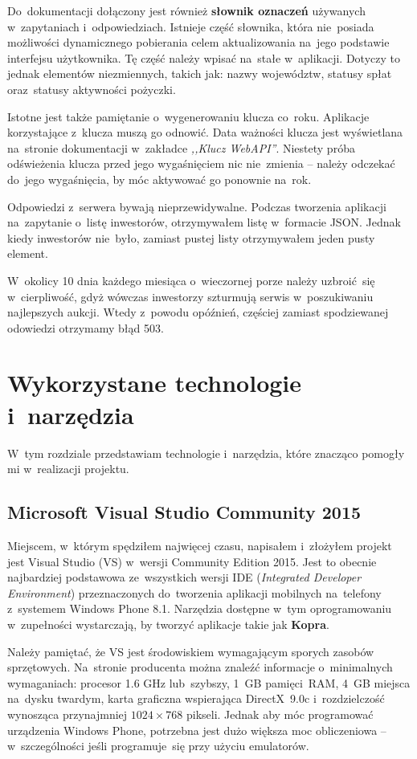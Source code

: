 \documentclass[a4paper,twoside,titlepage,openright]{book}
\begin{document}
Do~dokumentacji dołączony jest również \textbf{słownik oznaczeń} używanych w~zapytaniach i~odpowiedziach. Istnieje część słownika, która nie~posiada możliwości dynamicznego pobierania celem aktualizowania na~jego podstawie interfejsu użytkownika. Tę część należy wpisać na~stałe w~aplikacji. Dotyczy to jednak elementów niezmiennych, takich jak: nazwy województw, statusy spłat oraz~statusy aktywności pożyczki. 

Istotne jest także pamiętanie o~wygenerowaniu klucza co~roku. Aplikacje korzystające z~klucza muszą go odnowić. Data ważności klucza jest wyświetlana na~stronie dokumentacji w~zakładce \textit{,,Klucz WebAPI''}. Niestety próba odświeżenia klucza przed jego wygaśnięciem nic nie~zmienia -- należy odczekać do~jego wygaśnięcia, by móc aktywować go ponownie na~rok. 

Odpowiedzi z~serwera bywają nieprzewidywalne. Podczas tworzenia aplikacji na~zapytanie o~listę inwestorów, otrzymywałem listę w~formacie JSON. Jednak kiedy inwestorów nie~było, zamiast pustej listy otrzymywałem jeden pusty element. 

W~okolicy 10 dnia każdego miesiąca o~wieczornej porze należy uzbroić~się w~cierpliwość, gdyż wówczas inwestorzy szturmują serwis w~poszukiwaniu najlepszych aukcji. Wtedy z~powodu opóźnień, częściej zamiast spodziewanej odowiedzi otrzymamy błąd 503.


\chapter{Wykorzystane technologie i~narzędzia}
W~tym rozdziale przedstawiam technologie i~narzędzia, które znacząco pomogły mi w~realizacji projektu.

\section{Microsoft Visual Studio Community 2015}
Miejscem, w~którym spędziłem najwięcej czasu, napisałem i~złożyłem projekt jest Visual Studio (VS) w~wersji Community Edition 2015. Jest to obecnie najbardziej podstawowa ze~wszystkich wersji IDE (\textit{Integrated Developer Environment}) przeznaczonych do~tworzenia aplikacji mobilnych na~telefony z~systemem Windows Phone 8.1. Narzędzia dostępne w~tym oprogramowaniu w~zupełności wystarczają, by tworzyć aplikacje takie jak \textbf{Kopra}. 

Należy pamiętać, że VS jest środowiskiem wymagającym sporych zasobów sprzętowych. Na~stronie producenta \cite{vs} można znaleźć informacje o~minimalnych wymaganiach: procesor 1.6 GHz lub~szybszy, 1~GB pamięci~RAM, 4~GB miejsca na~dysku twardym, karta graficzna wspierająca DirectX~9.0c i~rozdzielczość wynosząca przynajmniej $ 1024 \times 768 $ pikseli. Jednak aby móc programować urządzenia Windows Phone, potrzebna jest dużo większa moc obliczeniowa -- w~szczególności jeśli programuje~się przy użyciu emulatorów.
\end{document}

